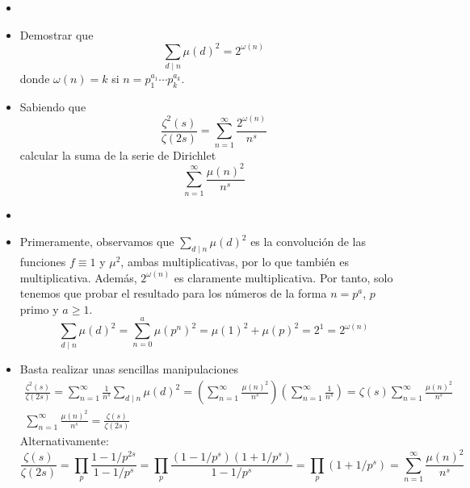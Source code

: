 \documentclass[twoside]{article}
\begin{document}
\begin{ejercicio}{5}
\begin{itemize}
\item[]
\item Demostrar que 
\[
\sum_{d\mid n} \mu(d)^2 = 2^{\omega(n)}
\]
donde $\omega(n)=k$ si $n=p_1^{a_1}\cdots p_k^{a_k}$.
\item Sabiendo que
\[
\frac{\zeta^2(s)}{\zeta(2s)}=\sum_{n=1}^\infty \frac{2^{\omega(n)}}{n^s}
\]
calcular la suma de la serie de Dirichlet
$$
\sum_{n=1}^\infty \frac{\mu(n)^2}{n^s}
$$
\end{itemize}
\begin{solucion}
\begin{itemize}
\item[]
\item Primeramente, observamos que $\sum_{d\mid n} \mu(d)^2$ es la convolución de las funciones $f\equiv 1$ y $\mu^2$, ambas multiplicativas, por lo que también es multiplicativa. Además, $2^{\omega(n)}$ es claramente multiplicativa. Por tanto, solo tenemos que probar el resultado para los números de la forma $n=p^a$, $p$ primo y $a\geq 1$.
\[
\sum_{d\mid n} \mu(d)^2 = \sum_{n=0}^a \mu(p^n)^2 = \mu(1)^2 + \mu(p)^2 = 2^1 = 2^{\omega(n)}
\]
\item Basta realizar unas sencillas manipulaciones
\begin{gather*}
\frac{\zeta^2(s)}{\zeta(2s)}=\sum_{n=1}^\infty \frac{1}{n^s}\sum_{d\mid n} \mu(d)^2 = \left(\sum_{n=1}^\infty \frac{\mu(n)^2}{n^s}\right)\left(\sum_{n=1}^\infty \frac{1}{n^s}\right) = \zeta(s)\sum_{n=1}^\infty \frac{\mu(n)^2}{n^s}\\
\sum_{n=1}^\infty \frac{\mu(n)^2}{n^s} = \frac{\zeta(s)}{\zeta(2s)}
\end{gather*}
Alternativamente:
\[ \frac{ζ(s)}{ζ(2s)} = \prod_p \frac{1-1/p^{2s}}{1-1/p^s} = \prod_p \frac{(1-1/p^s)(1+1/p^s)}{1-1/p^s} = \prod_p (1+1/p^s) = \sum_{n=1}^{∞} \frac{μ(n)^2}{n^s} \]
\end{itemize}
\end{solucion}
\end{ejercicio}
\newpage
\end{document}
